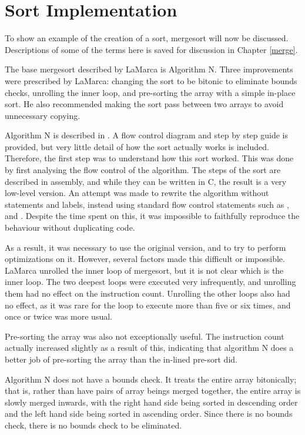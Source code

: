 \section{Sort Implementation}

To show an example of the creation of a sort, mergesort will now be discussed.
Descriptions of some of the terms here is saved for discussion in Chapter
\ref{merge}.

The base mergesort described by LaMarca is Algorithm N. Three improvements
were prescribed by LaMarca: changing the sort to be bitonic to eliminate bounds
checks, unrolling the inner loop, and pre-sorting the array with a simple in-place
sort. He also recommended making the sort pass between two arrays to avoid
unnecessary copying.

Algorithm N is described in \cite{Knuth98}. A flow control diagram and step by
step guide is provided, but very little detail of how the sort actually works is
included. Therefore, the first step was to understand how this sort worked. This
was done by first analysing the flow control of the algorithm. The steps of the
sort are described in assembly, and while they can be written in C, the result
is a very low-level version. An attempt was made to rewrite the algorithm
without  statements and labels, instead using standard flow control
statements such as ,  and . Despite the time spent
on this, it was impossible to faithfully reproduce the behaviour without
duplicating code.

As a result, it was necessary to use the original version, and to try to perform
optimizations on it. However, several factors made this difficult or impossible.
LaMarca unrolled the inner loop of mergesort, but it is not clear which is the
inner loop. The two deepest loops were executed very infrequently, and
unrolling them had no effect on the instruction count. Unrolling the other loops
also had no effect, as it was rare for the loop to execute more than five or six
times, and once or twice was more usual.

Pre-sorting the array was also not exceptionally useful. The instruction count
actually increased slightly as a result of this, indicating that algorithm N
does a better job of pre-sorting the array than the in-lined pre-sort did.

Algorithm N does not have a bounds check. It treats the entire array
bitonically; that is, rather than have pairs of array beings merged together,
the entire array is slowly merged inwards, with the right hand side being sorted
in descending order and the left hand side being sorted in ascending order.
Since there is no bounds check, there is no bounds check to be eliminated.

